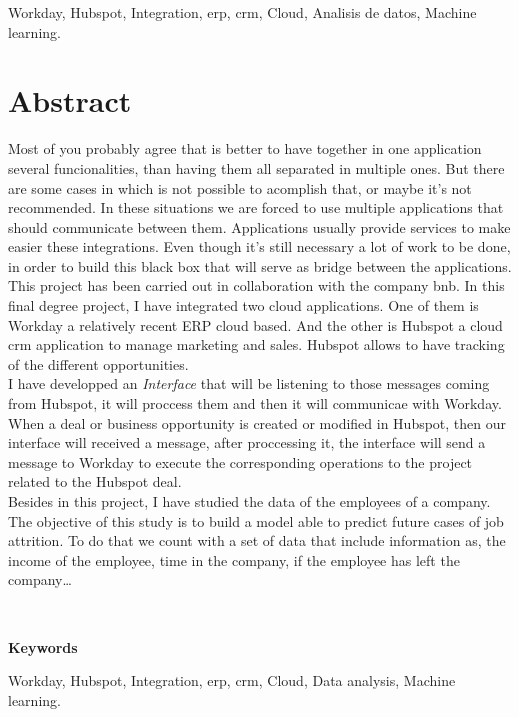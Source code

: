     Workday, Hubspot, Integration, \acrshort{erp}, \acrshort{crm}, Cloud, Analisis de datos, Machine learning.


\chapter*{Abstract}
	Most of you probably agree that is better to have together in one application several funcionalities, than having them all separated in multiple ones.
	But there are some cases in which is not possible to acomplish that, or maybe it's not recommended. 
	In these situations we are forced to use multiple applications that should communicate between them.
	Applications usually provide services to make easier these integrations. Even though it's still necessary a lot of work to be done, in order to build this black box that will serve as bridge between the applications.\\
	
	This project has been carried out in collaboration with the company \acrfull{bnb}.
	In this final degree project, I have integrated two cloud applications. One of them is Workday a relatively recent ERP cloud based. 
	And the other is Hubspot a cloud \acrshort{crm} application to manage marketing and sales. Hubspot allows to have tracking of the different opportunities.\\
	
	I have developped an \textit{Interface} that will be listening to those messages coming from Hubspot, it will proccess them and then it will communicae with Workday.
	When a deal or business opportunity is created or modified in Hubspot, then our interface will received a message, after proccessing it,
	the interface will send a message to Workday to execute the corresponding operations to the project related to the Hubspot deal.\\
	
	
	Besides in this project, I have studied the data of the employees of a company.
	The objective of this study is to build a model able to predict future cases of job attrition.
	To do that we count with a set of data that include information as, the income of the employee, time in the company,
	if the employee has left the company\ldots
	
	
	\
	
	\textbf{Keywords}
    
    Workday, Hubspot, Integration, \acrshort{erp}, \acrshort{crm}, Cloud, Data analysis, Machine learning.
	
	
